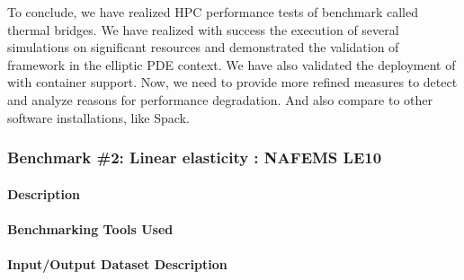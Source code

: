 To conclude, we have realized HPC performance tests of benchmark called thermal
bridges. We have realized with success the execution of several simulations on
significant resources and demonstrated the validation of \Feelpp framework in the
elliptic PDE context. We have also validated the deployment of \Feelpp with
container support. Now, we need to provide more refined measures to detect and
analyze reasons for performance degradation. And also compare to other software
installations, like Spack.



\subsubsection{Benchmark \#2: Linear elasticity : NAFEMS LE10}

\paragraph{Description}


  

\paragraph{Benchmarking Tools Used}

\paragraph{Input/Output Dataset Description}


